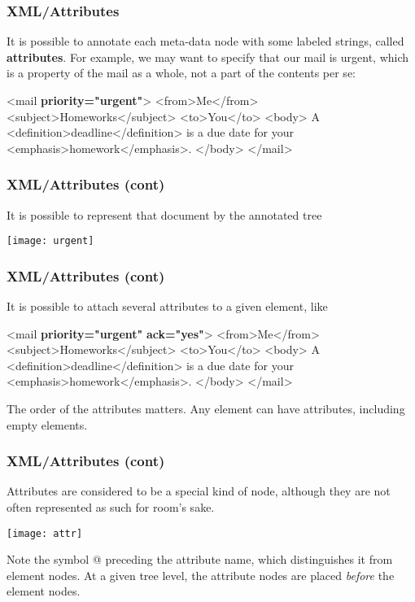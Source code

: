 %
\begin{frame}[containsverbatim]
\frametitle{XML/Attributes}

It is possible to annotate each meta-data node with some labeled
strings, called \textbf{attributes}. For example, we may want to
specify that our mail is urgent, which is a property of the mail
as a whole, not a part of the contents per se:
{\small
\begin{semiverbatim}
<mail \textbf{priority="urgent"}>
  <from>Me</from>
  <subject>Homeworks</subject>
  <to>You</to>
  <body>
  A <definition>deadline</definition> is a due date for your
<emphasis>homework</emphasis>.
  </body>
</mail>
\end{semiverbatim}
}

\end{frame}

%
\begin{frame}
\frametitle{XML/Attributes (cont)}

It is possible to represent that \XML document by the annotated tree
\begin{center}
\texttt{[image: urgent]}
\end{center}

\end{frame}

%
\begin{frame}[containsverbatim]
\frametitle{XML/Attributes (cont)}

It is possible to attach several attributes to a given element, like
{\small
\begin{semiverbatim}
<mail \textbf{priority="urgent"} \textbf{ack="yes"}>
  <from>Me</from>
  <subject>Homeworks</subject>
  <to>You</to>
  <body>
  A <definition>deadline</definition> is a due date for your
<emphasis>homework</emphasis>.
  </body>
</mail>
\end{semiverbatim}
}
The order of the attributes matters. Any element can have attributes,
including empty elements.

\end{frame}

%
\begin{frame}
\frametitle{XML/Attributes (cont)}

Attributes are considered to be a special kind of node, although they
are not often represented as such for room's sake.
\begin{center}
\texttt{[image: attr]}
\end{center}
Note the symbol \textsf{@} preceding the attribute name, which
distinguishes it from element nodes. At a given tree level, the
attribute nodes are placed \emph{before} the element nodes.

\end{frame}

